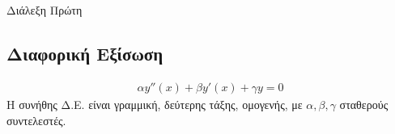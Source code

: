 \documentclass[]{extarticle}
\begin{document}
\begin{multicols*}{2}

    \tableofcontents
    \newpage
    \chapter{}{Διάλεξη Πρώτη}
    \section{Διαφορική Εξίσωση}
    \begin{equation*}
        \begin{aligned}
            \alpha y''(x) + \beta y' (x)+ \gamma y = 0
        \end{aligned}
    \end{equation*}
    Η συνήθης Δ.Ε. είναι γραμμική, δεύτερης τάξης, ομογενής, με
    \begin{math}
        α,β,γ
    \end{math}
    σταθερούς συντελεστές.

\end{multicols*}
\end{document}
